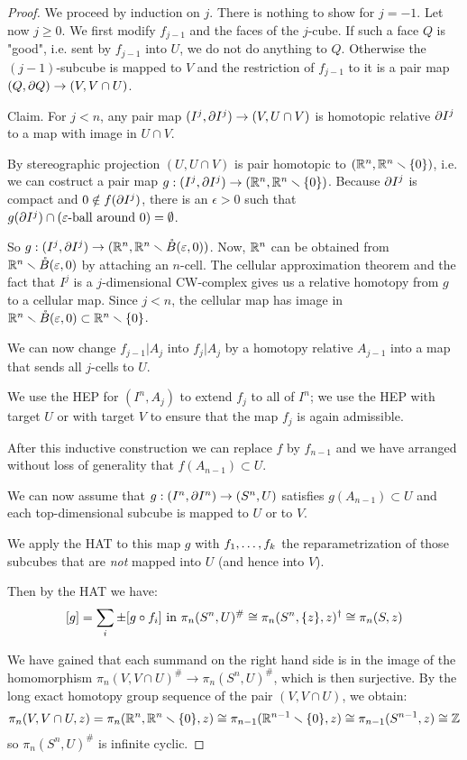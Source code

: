 \begin{proof}
We proceed by induction on $j$. There is nothing to show for $j=-1$. Let now $j\geq 0$. We first modify $f_{j-1}$ and the faces of the $j$-cube. If such a face $Q$ is "good", i.e. sent by $f_{j-1}$ into $U$, we do not do anything to $Q$. Otherwise the $(j-1)$-subcube is mapped to $V$ and the restriction of $f_{j-1}$ to it is a pair map $(Q,\partial Q)\to (V,V\cap U)$.

Claim. For $j<n$, any pair map $(I^j,\partial I^j)\to (V,U\cap V)$ is homotopic relative $\partial I^j$ to a map with image in $U\cap V$.

\begin{claimproof}
By stereographic projection $(U,U\cap V)$ is pair homotopic to $({\mathbb R}^n,{\mathbb R}^n\smallsetminus\{0\})$, i.e. we can costruct a pair map $g:(I^j,\partial I^j)\to ({\mathbb R}^n,{\mathbb R}^n\smallsetminus\{0\})$. Because $\partial I^j$ is compact and $0\notin f(\partial I^j)$, there is an $\epsilon>0$ such that $g(\partial I^j)\cap(\varepsilon\text{-ball around }0)=\emptyset$.

So $g:(I^j,\partial I^j)\to({\mathbb R}^n,{\mathbb R}^n\smallsetminus\mathring B(\varepsilon,0))$. Now, ${\mathbb R}^n$ can be obtained from ${\mathbb R}^n\smallsetminus\mathring B(\varepsilon,0)$ by attaching an $n$-cell. The cellular approximation theorem and the fact that $I^j$ is a $j$-dimensional CW-complex gives us a relative homotopy from $g$ to a cellular map. Since $j<n$, the cellular map has image in ${\mathbb R}^n\smallsetminus\mathring B(\varepsilon,0)\subset{\mathbb R}^n\smallsetminus\{0\}$.
\end{claimproof}

We can now change $f_{j-1}|A_j$ into $f_j|A_j$ by a homotopy relative $A_{j-1}$ into a map that sends all $j$-cells to $U$.

We use the HEP for $(I^n,A_j)$ to extend $f_j$ to all of $I^n$; we use the HEP with target $U$ or with target $V$ to ensure that the map $f_j$ is again admissible.

After this inductive construction we can replace $f$ by $f_{n-1}$ and we have arranged without loss of generality that $f(A_{n-1})\subset U$.

We can now assume that $g:(I^n,\partial I^n)\to(S^n,U)$ satisfies $g(A_{n-1})\subset U$ and each top-dimensional subcube is mapped to $U$ or to $V$.

We apply the HAT to this map $g$ with ${{f}_1,\dots,{f}_{k}}$ the reparametrization of those subcubes that are \textit{not} mapped into $U$ (and hence into $V$).

Then by the HAT we have:
\[[g]=\sum_i\pm[g\circ f_i]\text{ in }\pi_n(S^n,U)^\#\cong\pi_n(S^n,\{z\},z)^\dagger\cong\pi_n(S,z)\]

We have gained that each summand on the right hand side is in the image of the homomorphism $\pi_n(V,V\cap U)^\#\to\pi_n(S^n,U)^\#$, which is then surjective. By the long exact homotopy group sequence of the pair $(V,V\cap U)$, we obtain:
\[\pi_n(V,V\cap U,z)=\pi_n({\mathbb R}^n,{\mathbb R}^n\smallsetminus\{0\},z)\cong\pi_{n-1}({\mathbb R}^{n-1}\smallsetminus\{0\},z)\cong\pi_{n-1}(S^{n-1},z)\cong{\mathbb Z}\]
so $\pi_n(S^n,U)^\#$ is infinite cyclic.

\end{proof}

